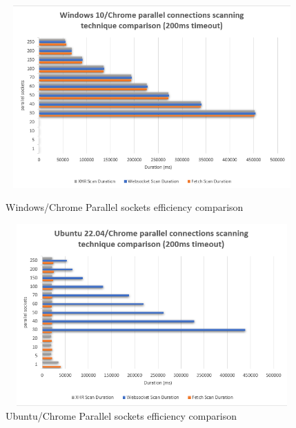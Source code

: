 \begin{figure}[ht]
\begin{adjustwidth}{-3cm}{-1cm}
\centering
\begin{minipage}{.45\textwidth}
  \centering
\includegraphics[width=15cm, height=7cm, keepaspectratio]{port_scanning_techniques/img/windows_chrome_scan_technique_comparison.png}
    \caption{Windows/Chrome Parallel sockets efficiency comparison}
    \label{fig:appendix-windows_chrome_n_sockets}
\end{minipage}
\hspace{0.5cm} %
\begin{minipage}{.45\textwidth}
\includegraphics[width=15cm, height=7cm, keepaspectratio]{port_scanning_techniques/img/ubuntu_chrome_scan_technique_comparison.png}
    \caption{Ubuntu/Chrome Parallel sockets efficiency comparison}
    \label{fig:appendix-ubuntu_chrome_n_sockets}
\end{minipage}
\end{adjustwidth}
\end{figure}

